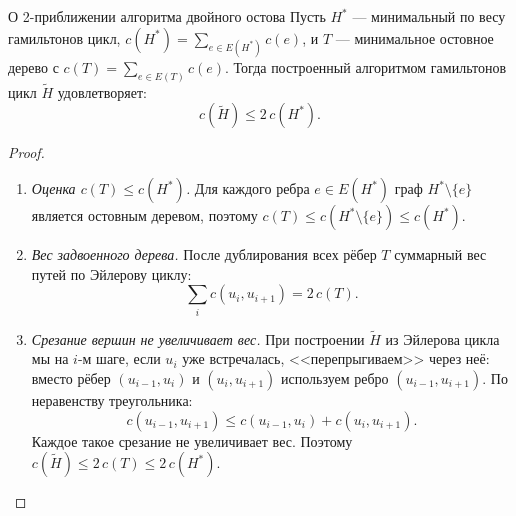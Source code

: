 \begin{center}
\end{center}

\begin{Theorem}{О 2-приближении алгоритма двойного остова}{}
	Пусть $H^*$ — минимальный по весу гамильтонов цикл, $c(H^*) = \sum_{e\in E(H^*)} c(e)$, и $T$ — минимальное остовное дерево с $c(T) = \sum_{e \in E(T)} c(e)$. Тогда построенный алгоритмом гамильтонов цикл $\widetilde{H}$ удовлетворяет:
	\[
	c(\widetilde{H}) \leq 2\,c(H^*).
	\]
\end{Theorem}

\begin{proof}
\begin{enumerate}
	\item \emph{Оценка $c(T) \leq c(H^*)$.} Для каждого ребра $e \in E(H^*)$ граф $H^* \setminus \{e\}$ является остовным деревом, поэтому $c(T) \leq c(H^* \setminus \{e\}) \leq c(H^*)$.
	
	\item \emph{Вес задвоенного дерева.} После дублирования всех рёбер $T$ суммарный вес путей по Эйлерову циклу:
	\[
	\sum_{i} c(u_i, u_{i+1}) = 2\,c(T).
	\]
	
	\item \emph{Срезание вершин не увеличивает вес.} При построении $\widetilde{H}$ из Эйлерова цикла мы на $i$-м шаге, если $u_i$ уже встречалась, <<перепрыгиваем>> через неё: вместо рёбер $(u_{i-1},u_i)$ и $(u_i,u_{i+1})$ используем ребро $(u_{i-1},u_{i+1})$. По неравенству треугольника:
	\[
	c(u_{i-1}, u_{i+1}) \leq c(u_{i-1},u_i) + c(u_i, u_{i+1}).
	\]
	Каждое такое срезание не увеличивает вес. Поэтому $c(\widetilde{H}) \leq 2\,c(T) \leq 2\,c(H^*)$.
\end{enumerate}
\end{proof}

